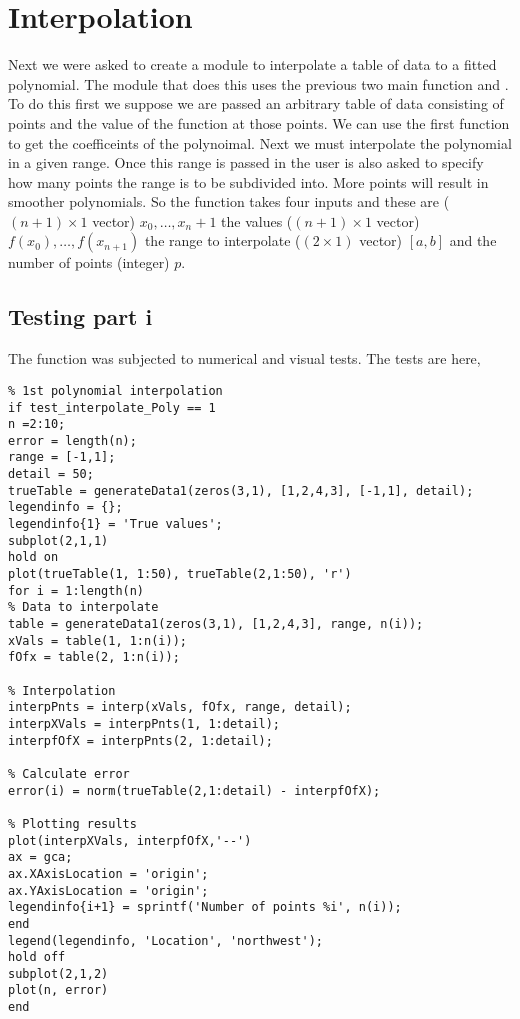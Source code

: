 \documentclass[]{article}
\begin{document}
\section*{Interpolation} Next we were asked to create a module to interpolate a table of data to a fitted  polynomial. The module that does this uses the previous two main function  and . To do this first we suppose we are passed an arbitrary table of data consisting of points and the value of the function at those points. We can use the first function  to get the coefficeints of the polynoimal. Next we must interpolate the polynomial in a given range. Once this range is passed in the user is also asked to specify how many points the range is to be subdivided into. More points will result in smoother polynomials. So the function  takes four inputs and these are ($ (n+1)\times1 $ vector) $ x_0, \dots, x_n+1 $ the values ($ (n+1)\times1 $ vector) $ f(x_0), \dots, f(x_{n+1}) $ the range to interpolate ($ (2\times1) $ vector) $ [a,b] $ and the number of points (integer) $ p $. 


\subsection*{Testing part i} The function was subjected to numerical and visual tests. The tests are here, 
\begin{lstlisting}
% 1st polynomial interpolation 
if test_interpolate_Poly == 1
n =2:10;
error = length(n);
range = [-1,1];
detail = 50;
trueTable = generateData1(zeros(3,1), [1,2,4,3], [-1,1], detail);
legendinfo = {};
legendinfo{1} = 'True values';
subplot(2,1,1)
hold on
plot(trueTable(1, 1:50), trueTable(2,1:50), 'r') 
for i = 1:length(n)
% Data to interpolate
table = generateData1(zeros(3,1), [1,2,4,3], range, n(i));
xVals = table(1, 1:n(i));
fOfx = table(2, 1:n(i));

% Interpolation
interpPnts = interp(xVals, fOfx, range, detail);
interpXVals = interpPnts(1, 1:detail);
interpfOfX = interpPnts(2, 1:detail);

% Calculate error
error(i) = norm(trueTable(2,1:detail) - interpfOfX);

% Plotting results
plot(interpXVals, interpfOfX,'--')
ax = gca;
ax.XAxisLocation = 'origin';
ax.YAxisLocation = 'origin';
legendinfo{i+1} = sprintf('Number of points %i', n(i));
end
legend(legendinfo, 'Location', 'northwest');
hold off
subplot(2,1,2)
plot(n, error)
end
\end{lstlisting}
\end{document}
